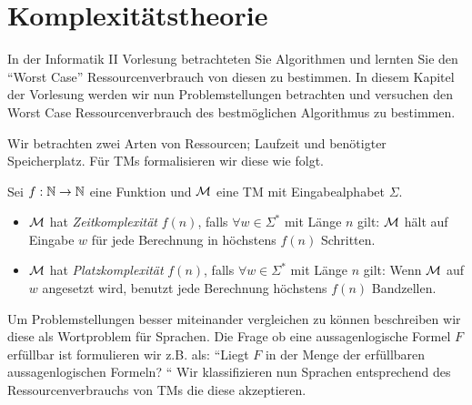 \section[Komplexitätstheorie]{Komplexitätstheorie}

In der Informatik II Vorlesung betrachteten Sie Algorithmen und lernten Sie den ``Worst Case'' Ressourcenverbrauch von diesen zu bestimmen.
In diesem Kapitel der Vorlesung werden wir nun Problemstellungen betrachten und versuchen den Worst Case Ressourcenverbrauch des bestmöglichen Algorithmus zu bestimmen.

Wir betrachten zwei Arten von Ressourcen; Laufzeit und benötigter Speicherplatz.
Für \acp{TM} formalisieren wir diese wie folgt.

\begin{Def}
Sei $f:\mathbb{N}\rightarrow\mathbb{N}$ eine Funktion und $\mathcal{M}$ eine \ac{TM} mit Eingabealphabet $\Sigma$.
\begin{itemize}
 \item $\mathcal{M}$ hat \emph{Zeitkomplexität} $f(n)$, falls $\forall w\in\Sigma^*$ mit Länge $n$ gilt: $\mathcal{M}$ hält auf Eingabe $w$ für jede Berechnung in höchstens $f(n)$ Schritten.
 \item $\mathcal{M}$ hat \emph{Platzkomplexität} $f(n)$, falls $\forall w\in\Sigma^*$ mit Länge $n$ gilt: Wenn $\mathcal{M}$ auf $w$ angesetzt wird, benutzt jede Berechnung höchstens $f(n)$ Bandzellen.
 \qedhere
\end{itemize}
\end{Def}


Um Problemstellungen besser miteinander vergleichen zu können beschreiben wir diese als Wortproblem für Sprachen.
Die Frage ob eine aussagenlogische Formel $F$ erfüllbar ist formulieren wir z.B. als:
``Liegt $F$ in der Menge der erfüllbaren aussagenlogischen Formeln? ``
Wir klassifizieren nun Sprachen entsprechend des Ressourcenverbrauchs von \acp{TM} die diese akzeptieren.


